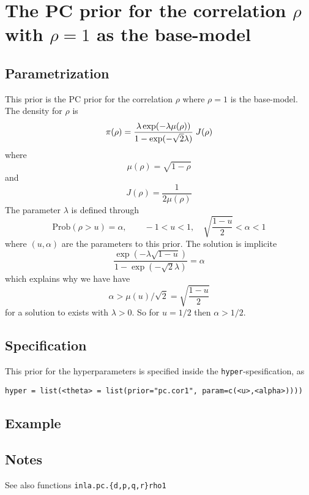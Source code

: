 \documentclass[a4paper,11pt]{article}
\begin{document}
\section*{The PC prior for the correlation $\rho$ with $\rho=1$ as the
    base-model}

\subsection*{Parametrization}
This prior is the PC prior for the correlation $\rho$ where $\rho=1$
is the base-model. The density for $\rho$ is
\begin{displaymath}
    \pi(\rho) = \frac{\lambda \exp(-\lambda \mu(\rho))}{%
        1-\exp(-\sqrt{2}\lambda)} \; J(\rho)
\end{displaymath}
where
\begin{displaymath}
    \mu(\rho) = \sqrt{1-\rho}
\end{displaymath}
and
\begin{displaymath}
    J(\rho) = \frac{1}{2\mu(\rho)}
\end{displaymath}
The parameter $\lambda$ is defined through
\begin{displaymath}
    \text{Prob}( \rho > u) = \alpha, \qquad -1 < u < 1, \quad
    \sqrt{\frac{1-u}{2}} <\alpha<1
\end{displaymath}
where $(u, \alpha{})$ are the parameters to this prior. The solution
is implicite
\begin{displaymath}
    \frac{\exp(-\lambda \sqrt{1-u})}{1-\exp(-\sqrt{2}\lambda)} = \alpha
\end{displaymath}
which explains why we have have
\begin{displaymath}
    \alpha > \mu(u)/\sqrt{2} = \sqrt{\frac{1-u}{2}}
\end{displaymath}
for a solution to exists with $\lambda > 0$. 
So for $u=1/2$ then $\alpha > 1/2$.

\subsection*{Specification}
This prior for the hyperparameters is specified inside the
\texttt{hyper}-spesification, as
\begin{center}
    \texttt{hyper = list(<theta> = list(prior="pc.cor1", param=c(<u>,<alpha>))))}
\end{center}

\subsection*{Example}

\subsection*{Notes}

See also functions \texttt{inla.pc.\{d,p,q,r\}rho1}
\end{document}
